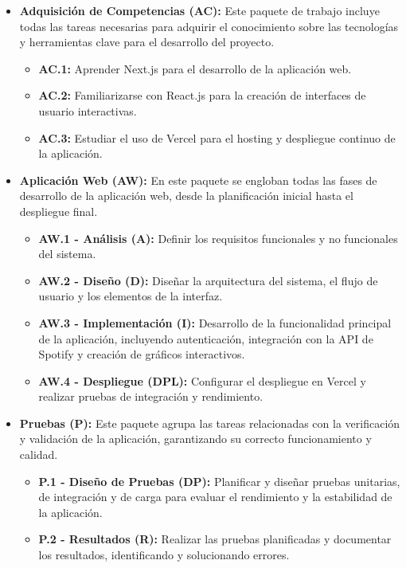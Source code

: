 \begin{itemize}
    \item \textbf{Adquisición de Competencias (AC):}
          Este paquete de trabajo incluye todas las tareas necesarias para adquirir el conocimiento sobre las tecnologías y herramientas clave para el desarrollo del proyecto.
          \begin{itemize}
              \item \textbf{AC.1:} Aprender Next.js para el desarrollo de la aplicación web.
              \item \textbf{AC.2:} Familiarizarse con React.js para la creación de interfaces de usuario interactivas.
              \item \textbf{AC.3:} Estudiar el uso de Vercel para el hosting y despliegue continuo de la aplicación.
          \end{itemize}

    \item \textbf{Aplicación Web (AW):}
          En este paquete se engloban todas las fases de desarrollo de la aplicación web, desde la planificación inicial hasta el despliegue final.
          \begin{itemize}
              \item \textbf{AW.1 - Análisis (A):} Definir los requisitos funcionales y no funcionales del sistema.
              \item \textbf{AW.2 - Diseño (D):} Diseñar la arquitectura del sistema, el flujo de usuario y los elementos de la interfaz.
              \item \textbf{AW.3 - Implementación (I):} Desarrollo de la funcionalidad principal de la aplicación, incluyendo autenticación, integración con la API de Spotify y creación de gráficos interactivos.
              \item \textbf{AW.4 - Despliegue (DPL):} Configurar el despliegue en Vercel y realizar pruebas de integración y rendimiento.
          \end{itemize}

    \item \textbf{Pruebas (P):}
          Este paquete agrupa las tareas relacionadas con la verificación y validación de la aplicación, garantizando su correcto funcionamiento y calidad.
          \begin{itemize}
              \item \textbf{P.1 - Diseño de Pruebas (DP):} Planificar y diseñar pruebas unitarias, de integración y de carga para evaluar el rendimiento y la estabilidad de la aplicación.
              \item \textbf{P.2 - Resultados (R):} Realizar las pruebas planificadas y documentar los resultados, identificando y solucionando errores.
          \end{itemize}


\end{itemize}
